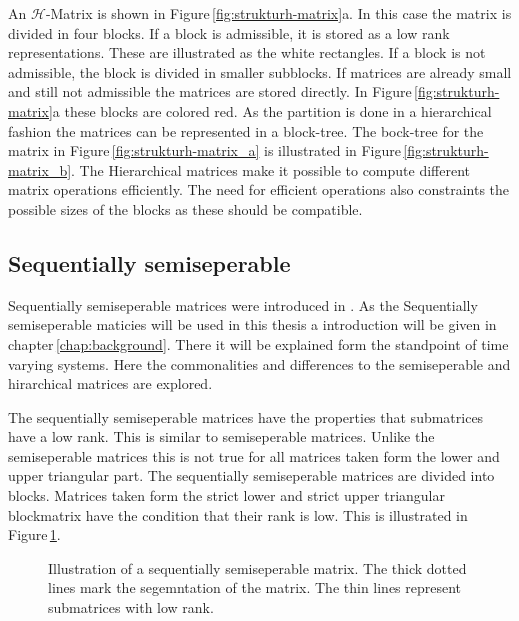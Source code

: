 \documentclass[doctype=mastersthesis,BCOR=15mm,biblatex]{ldvbook}%
\begin{document}
An $\mathcal{H}$-Matrix is shown in Figure\,\ref{fig:strukturh-matrix}a. 
In this case the matrix is divided in four blocks.
If a block is admissible, it is stored as a low rank representations. These are illustrated as the white rectangles.
If a block is not admissible, the block is divided in smaller subblocks.
If matrices are already small and still not admissible the matrices are stored directly. In Figure\,\ref{fig:strukturh-matrix}a these blocks are colored red.
As the partition is done in a hierarchical fashion the matrices can be represented in a block-tree. 
The bock-tree for the matrix in Figure\,\ref{fig:strukturh-matrix_a} is illustrated in Figure\,\ref{fig:strukturh-matrix_b}.
The Hierarchical matrices make it possible to compute different matrix operations efficiently. 
The need for efficient operations also constraints the possible sizes of the blocks as these should be compatible.

\subsection{Sequentially semiseperable}
Sequentially semiseperable matrices were introduced in \cite{dewilde_time-varying_1998}.
As the Sequentially semiseperable maticies will be used in this thesis a introduction will be given in chapter\,\ref{chap:background}. 
There it will be explained form the standpoint of time varying systems.
Here the commonalities and differences to the semiseperable and hirarchical matrices are explored.

The sequentially semiseperable matrices have the properties that submatrices have a low rank.
This is similar to semiseperable matrices. 
Unlike the semiseperable matrices this is not true for all matrices taken form the lower and upper triangular part.
The sequentially semiseperable matrices are divided into blocks.
Matrices taken form the strict lower and strict upper triangular blockmatrix have the condition that their rank is low.
This is illustrated in Figure\,\ref{fig:sequentiallysep}.

\begin{figure}[htb]
	\centering
	
	\caption{Illustration of a sequentially semiseperable matrix. The thick dotted lines mark the segemntation of the matrix. The thin lines represent submatrices with low rank.}
	\label{fig:sequentiallysep}
\end{figure}
\end{document}

